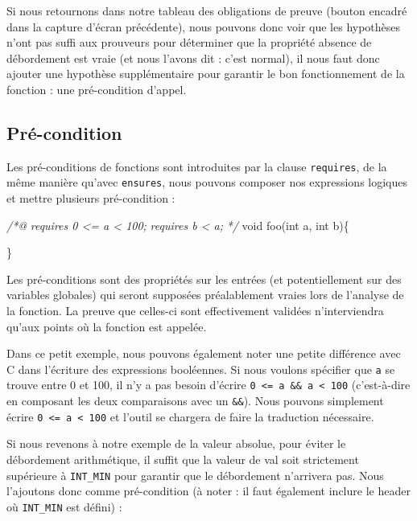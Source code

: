 \documentclass[12pt,francais,]{scrbook}
\newenvironment{Shaded}{}{}
\newcommand{\DataTypeTok}[1]{\textcolor[rgb]{0.56,0.13,0.00}{{#1}}}
\newcommand{\CommentTok}[1]{\textcolor[rgb]{0.38,0.63,0.69}{\textit{{#1}}}}
\newcommand{\NormalTok}[1]{{#1}}
\begin{document}
Si nous retournons dans notre tableau des obligations de preuve (bouton
encadré dans la capture d'écran précédente), nous pouvons donc voir que
les hypothèses n'ont pas suffi aux prouveurs pour déterminer que la
propriété \og{}absence de débordement\fg{} est vraie (et nous l'avons dit :
c'est normal), il nous faut donc ajouter une hypothèse supplémentaire
pour garantir le bon fonctionnement de la fonction : une pré-condition
d'appel.

\subsection{Pré-condition}\label{pruxe9-condition}

Les pré-conditions de fonctions sont introduites par la clause
\texttt{requires}, de la même manière qu'avec \texttt{ensures}, nous
pouvons composer nos expressions logiques et mettre plusieurs
pré-condition :

\begin{footnotesize}\begin{Shaded}
\begin{Highlighting}[]
\CommentTok{/*@}
\CommentTok{  requires 0 <= a < 100;}
\CommentTok{  requires b < a;}
\CommentTok{*/}
\DataTypeTok{void} \NormalTok{foo(}\DataTypeTok{int} \NormalTok{a, }\DataTypeTok{int} \NormalTok{b)\{}
  
\NormalTok{\}}
\end{Highlighting}
\end{Shaded}\end{footnotesize}

Les pré-conditions sont des propriétés sur les entrées (et
potentiellement sur des variables globales) qui seront supposées
préalablement vraies lors de l'analyse de la fonction. La preuve que
celles-ci sont effectivement validées n'interviendra qu'aux points où la
fonction est appelée.

Dans ce petit exemple, nous pouvons également noter une petite
différence avec C dans l'écriture des expressions booléennes. Si nous
voulons spécifier que \texttt{a} se trouve entre 0 et 100, il n'y a pas
besoin d'écrire \texttt{0\ \textless{}=\ a\ \&\&\ a\ \textless{}\ 100}
(c'est-à-dire en composant les deux comparaisons avec un \texttt{\&\&}).
Nous pouvons simplement écrire
\texttt{0\ \textless{}=\ a\ \textless{}\ 100} et l'outil se chargera de
faire la traduction nécessaire.

Si nous revenons à notre exemple de la valeur absolue, pour éviter le
débordement arithmétique, il suffit que la valeur de val soit
strictement supérieure à \texttt{INT\_MIN} pour garantir que le
débordement n'arrivera pas. Nous l'ajoutons donc comme pré-condition (à
noter : il faut également inclure le header où \texttt{INT\_MIN} est
défini) :
\end{document}
